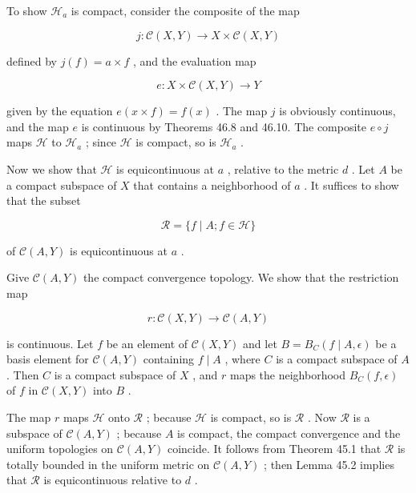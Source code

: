\documentclass[10pt]{article}
\begin{document}
To show \({\mathcal{H}}_{a}\) is compact, consider the composite of the map

\[
j : \mathcal{C}\left( {X,Y}\right)  \rightarrow  X \times  \mathcal{C}\left( {X,Y}\right)
\]

defined by \(j\left( f\right)  = a \times  f\) , and the evaluation map

\[
e : X \times  \mathcal{C}\left( {X,Y}\right)  \rightarrow  Y
\]

given by the equation \(e\left( {x \times  f}\right)  = f\left( x\right)\) . The map \(j\) is obviously continuous, and the map \(e\) is continuous by Theorems 46.8 and 46.10. The composite \(e \circ  j\) maps \(\mathcal{H}\) to \({\mathcal{H}}_{a}\) ; since \(\mathcal{H}\) is compact, so is \({\mathcal{H}}_{a}\) .

Now we show that \(\mathcal{H}\) is equicontinuous at \(a\) , relative to the metric \(d\) . Let \(A\) be a compact subspace of \(X\) that contains a neighborhood of \(a\) . It suffices to show that the subset

\[
\mathcal{R} = \{ f \mid  A;f \in  \mathcal{H}\}
\]

of \(\mathcal{C}\left( {A,Y}\right)\) is equicontinuous at \(a\) .

Give \(\mathcal{C}\left( {A,Y}\right)\) the compact convergence topology. We show that the restriction map

\[
r : \mathcal{C}\left( {X,Y}\right)  \rightarrow  \mathcal{C}\left( {A,Y}\right)
\]

is continuous. Let \(f\) be an element of \(\mathcal{C}\left( {X,Y}\right)\) and let \(B = {B}_{C}\left( {f \mid  A,\epsilon }\right)\) be a basis element for \(\mathcal{C}\left( {A,Y}\right)\) containing \(f \mid  A\) , where \(C\) is a compact subspace of \(A\) . Then \(C\) is a compact subspace of \(X\) , and \(r\) maps the neighborhood \({B}_{C}\left( {f,\epsilon }\right)\) of \(f\) in \(\mathcal{C}\left( {X,Y}\right)\) into \(B\) .

The map \(r\) maps \(\mathcal{H}\) onto \(\mathcal{R}\) ; because \(\mathcal{H}\) is compact, so is \(\mathcal{R}\) . Now \(\mathcal{R}\) is a subspace of \(\mathcal{C}\left( {A,Y}\right)\) ; because \(A\) is compact, the compact convergence and the uniform topologies on \(\mathcal{C}\left( {A,Y}\right)\) coincide. It follows from Theorem 45.1 that \(\mathcal{R}\) is totally bounded in the uniform metric on \(\mathcal{C}\left( {A,Y}\right)\) ; then Lemma 45.2 implies that \(\mathcal{R}\) is equicontinuous relative to \(d\) .
\end{document}
